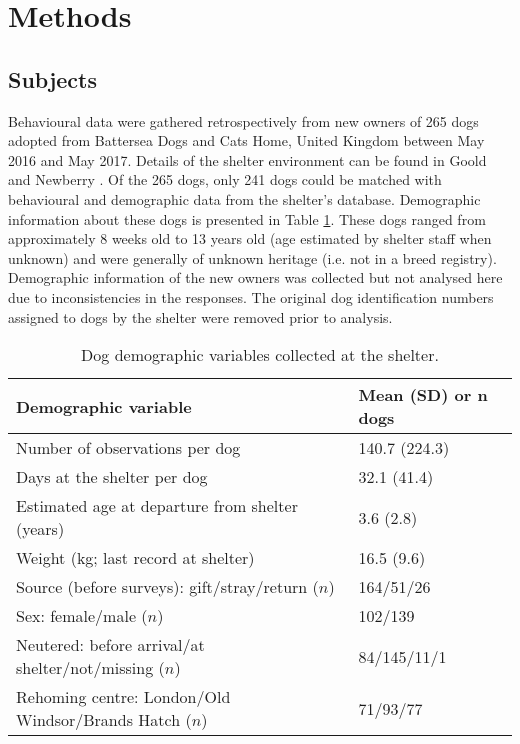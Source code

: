 \documentclass[fleqn,10pt]{wlscirep}
\begin{document}
\section*{Methods}

\subsection*{Subjects}
Behavioural data were gathered retrospectively from new owners of 265 dogs adopted from Battersea Dogs and Cats Home, United Kingdom between May 2016 and May 2017. Details of the shelter environment can be found in Goold and Newberry \cite{goold2017aggressiveness,goold2017modelling}. Of the 265 dogs, only 241 dogs could be matched with behavioural and demographic data from the shelter's database. Demographic information about these dogs is presented in Table \ref{table_demoshelter}. These dogs ranged from approximately 8 weeks old to 13 years old (age estimated by shelter staff when unknown) and were generally of unknown heritage (i.e. not in a breed registry). Demographic information of the new owners was collected but not analysed here due to inconsistencies in the responses. The original dog identification numbers assigned to dogs by the shelter were removed prior to analysis.

\begin{table}
  \centering
  \begin{tabular}{ll}
  \textbf{Demographic variable} & \textbf{Mean (SD) or $\boldsymbol{n}$ dogs}\\ \hline
  Number of observations per dog & 140.7 (224.3) \\
  Days at the shelter per dog & 32.1 (41.4)\\
  Estimated age at departure from shelter (years) & 3.6 (2.8)\\
  Weight (kg; last record at shelter) & 16.5 (9.6)\\
  Source (before surveys): gift/stray/return ($n$) & 164/51/26\\
  Sex: female/male ($n$) & 102/139\\
  Neutered: before arrival/at shelter/not/missing ($n$) & 84/145/11/1\\
  Rehoming centre: London/Old Windsor/Brands Hatch ($n$) & 71/93/77\\
  \hline
  \end{tabular}
  \caption{Dog demographic variables collected at the shelter.}
  \label{table_demoshelter}
\end{table}
\end{document}
